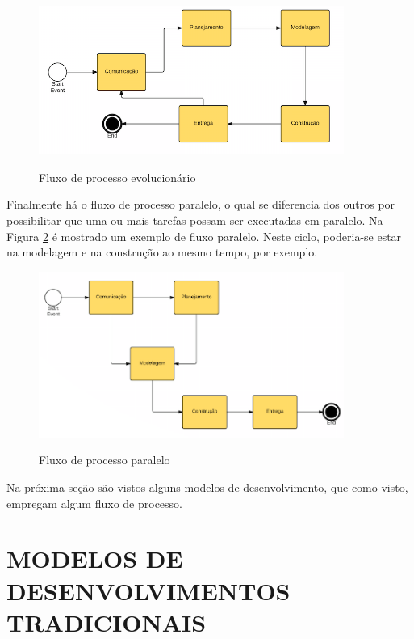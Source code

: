 \begin{figure}[htb!]
\begin{center}
\caption{Fluxo de processo evolucionário}
\label{fig:03}
\includegraphics[width=10cm]{assets/evolucionario} \\
\end{center}
\end{figure}

Finalmente há o fluxo de processo paralelo, o qual se diferencia dos outros por possibilitar que uma ou mais tarefas possam ser executadas em paralelo. Na Figura \ref{fig:04} é mostrado um exemplo de fluxo paralelo. Neste ciclo, poderia-se estar na modelagem e na construção ao mesmo tempo, por exemplo.

\begin{figure}[htb!]
\begin{center}
\caption{Fluxo de processo paralelo}
\label{fig:04}
\includegraphics[width=10cm]{assets/paralelo} \\
\end{center}
\end{figure}

Na próxima seção são vistos alguns modelos de desenvolvimento, que como visto, empregam algum fluxo de processo.

\section{MODELOS DE DESENVOLVIMENTOS TRADICIONAIS}

